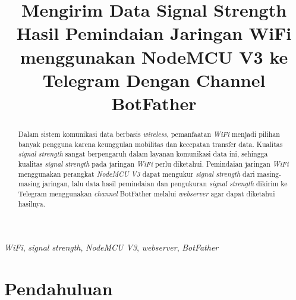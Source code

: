 \documentclass[journal,transmag]{IEEEtran}
\begin{document}
    
\title{Mengirim Data Signal Strength Hasil Pemindaian Jaringan WiFi menggunakan NodeMCU V3 ke Telegram Dengan Channel BotFather}

\author{
}

\maketitle

\begin{abstract}
    Dalam sistem komunikasi data berbasis \emph{wireless}, pemanfaatan \emph{WiFi} menjadi pilihan banyak pengguna karena keunggulan mobilitas dan kecepatan transfer data. Kualitas \emph{signal strength} sangat berpengaruh dalam layanan komunikasi data ini, sehingga kualitas \emph{signal strength} pada jaringan \emph{WiFi} perlu diketahui. Pemindaian jaringan \emph{WiFi} menggunakan perangkat \emph{NodeMCU V3} dapat mengukur \emph{signal strength} dari masing-masing jaringan, lalu data hasil pemindaian dan pengukuran \emph{signal strength} dikirim ke Telegram menggunakan \emph{channel} BotFather melalui \emph{webserver} agar dapat diketahui hasilnya.
\end{abstract}

\begin{IEEEkeywords}
    \emph{WiFi}, \emph{signal strength}, \emph{NodeMCU V3}, \emph{webserver}, \emph{BotFather}
\end{IEEEkeywords}

\section{Pendahuluan}



\end{document}
